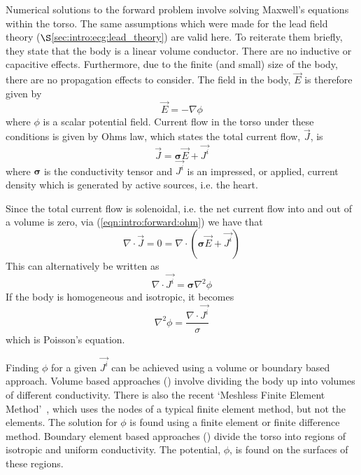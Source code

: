 Numerical solutions to the forward problem involve solving Maxwell's equations
within the torso.
The same assumptions which were made for the lead field theory
($\S$\ref{sec:intro:ecg:lead_theory}) are valid here.
To reiterate them briefly, they state that the body is a linear volume
conductor.
There are no inductive or capacitive effects.
Furthermore, due to the finite (and small) size of the body, there are no
propagation effects to consider.
The field in the body, $\vec{E}$ is therefore given by
\begin{equation}
\label{eqn:intro:forward:maxwell}
\vec{E} = -\nabla\phi
\end{equation}
where $\phi$ is a scalar potential field.
Current flow in the torso under these conditions is given by Ohms law, which
states the total current flow, $\vec{J}$, is
\begin{equation}
\label{eqn:intro:forward:ohm}
\vec{J} = \mathbf{\sigma}\vec{E} + \vec{J^i}
\end{equation}
where $\mathbf{\sigma}$ is the conductivity tensor and $\vec{J^i}$ is an
impressed, or applied, current density which is generated by active sources,
i.e. the heart.

Since the total current flow is solenoidal, i.e. the net current flow into and
out of a volume is zero, via (\ref{eqn:intro:forward:ohm}) we have that
\begin{equation}
\label{eqn:intro:forward:ohm2}
\nabla\cdot\vec{J} = 0 = \nabla\cdot\left(\mathbf{\sigma}\vec{E} + \vec{J^i} \right)
\end{equation}
This can alternatively be written as
\begin{equation}
\label{eqn:intro:forward:poisson}
\nabla\cdot\vec{J^i} = \mathbf{\sigma}\nabla^2\phi
\end{equation}
If the body is homogeneous and isotropic, it becomes
\begin{equation}
\label{eqn:intro:forward:poisson2}
\nabla^2\phi = \frac{\nabla\cdot\vec{J^i}}{\sigma}
\end{equation}
which is Poisson's equation.

Finding $\phi$ for a given $\vec{J^i}$ can be achieved using a volume or
boundary based approach.
Volume based approaches (\cite{Seger2004,Klepfer1997,Keller2007}) involve dividing the body
up into volumes of different conductivity.
There is also the recent `Meshless Finite Element Method'~\cite{Li2007a}, which
uses the nodes of a typical finite element method, but not the elements.
The solution for $\phi$ is found using a finite element or finite difference
method.
Boundary element based approaches
(\cite{Barr1966,Clayton2002,Gulrajani1989,Weixue1996}) divide the torso into
regions of isotropic and uniform conductivity.
The potential, $\phi$, is found on the surfaces of these regions.


